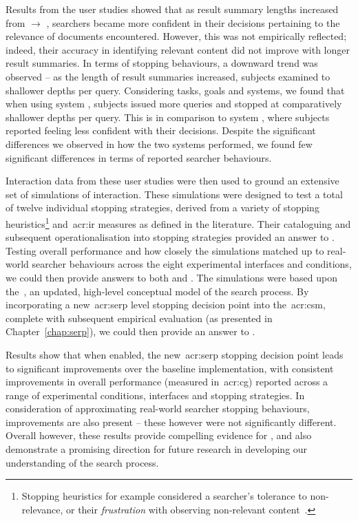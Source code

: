 Results from the user studies showed that as result summary lengths increased from  $\rightarrow$ , searchers became more confident in their decisions pertaining to the relevance of documents encountered. However, this was not empirically reflected; indeed, their accuracy in identifying relevant content did not improve with longer result summaries. In terms of stopping behaviours, a downward trend was observed -- as the length of result summaries increased, subjects examined to shallower depths per query. Considering tasks, goals and systems, we found that when using system , subjects issued more queries and stopped at comparatively shallower depths per query. This is in comparison to system , where subjects reported feeling less confident with their decisions. Despite the significant differences we observed in how the two systems performed, we found few significant differences in terms of reported searcher behaviours.

Interaction data from these user studies were then used to ground an extensive set of simulations of interaction. These simulations were designed to test a total of twelve individual stopping strategies, derived from a variety of stopping heuristics\footnote{Stopping heuristics for example considered a searcher's tolerance to non-relevance, or their \emph{frustration} with observing non-relevant content~\citep{kraft1979stopping_rules}.} and~\gls{acr:ir} measures as defined in the literature. Their cataloguing and subsequent operationalisation into stopping strategies provided an answer to . Testing overall performance and how closely the simulations matched up to real-world searcher behaviours across the eight experimental interfaces and conditions, we could then provide answers to both  and . The simulations were based upon the~, an updated, high-level conceptual model of the search process. By incorporating a new~\gls{acr:serp} level stopping decision point into the~\gls{acr:csm}, complete with subsequent empirical evaluation (as presented in Chapter~\ref{chap:serp}), we could then provide an answer to .

Results show that when enabled, the new~\gls{acr:serp} stopping decision point leads to significant improvements over the baseline implementation, with consistent improvements in overall performance (measured in~\gls{acr:cg}) reported across a range of experimental conditions, interfaces and stopping strategies. In consideration of approximating real-world searcher stopping behaviours, improvements are also present -- these however were not significantly different. Overall however, these results provide compelling evidence for , and also demonstrate a promising direction for future research in developing our understanding of the search process.



